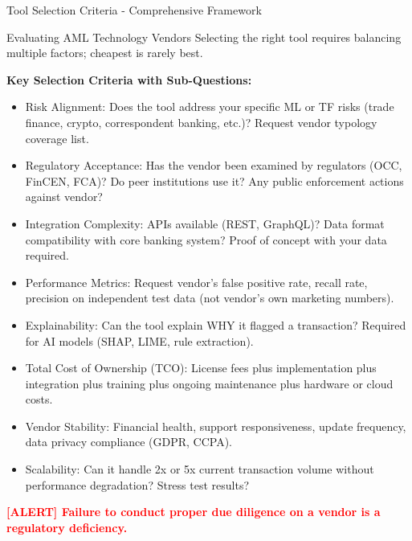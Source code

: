 \documentclass[11pt,a4paper]{beamer}
\newcommand{\redflag}[1]{\textcolor{red}{\textbf{[ALERT] #1}}}
\begin{document}
	\begin{frame}{Tool Selection Criteria - Comprehensive Framework}
		\begin{block}{Evaluating AML Technology Vendors}
			Selecting the right tool requires balancing multiple factors; cheapest is rarely best.
		\end{block}
		
		\textbf{Key Selection Criteria with Sub-Questions:}
		\begin{itemize}
			\item Risk Alignment: Does the tool address your specific ML or TF risks (trade finance, crypto, correspondent banking, etc.)? Request vendor typology coverage list.
			\item Regulatory Acceptance: Has the vendor been examined by regulators (OCC, FinCEN, FCA)? Do peer institutions use it? Any public enforcement actions against vendor?
			\item Integration Complexity: APIs available (REST, GraphQL)? Data format compatibility with core banking system? Proof of concept with your data required.
			\item Performance Metrics: Request vendor's false positive rate, recall rate, precision on independent test data (not vendor's own marketing numbers).
			\item Explainability: Can the tool explain WHY it flagged a transaction? Required for AI models (SHAP, LIME, rule extraction).
			\item Total Cost of Ownership (TCO): License fees plus implementation plus integration plus training plus ongoing maintenance plus hardware or cloud costs.
			\item Vendor Stability: Financial health, support responsiveness, update frequency, data privacy compliance (GDPR, CCPA).
			\item Scalability: Can it handle 2x or 5x current transaction volume without performance degradation? Stress test results?
		\end{itemize}
		
		\redflag{Failure to conduct proper due diligence on a vendor is a regulatory deficiency.}
	\end{frame}
	
\end{document}
